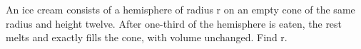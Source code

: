 An ice cream consists of a hemisphere of radius r on an empty cone of the same radius and height twelve. After one-third of the hemisphere is eaten, the rest melts and exactly fills the cone, with volume unchanged. Find r.
